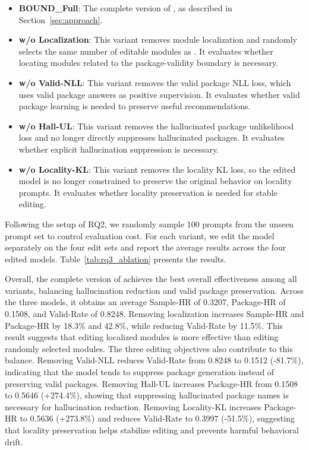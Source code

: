 \begin{itemize}[leftmargin=*]
    \item \textbf{BOUND\_Full}: The complete version of \appname, as described in Section~\ref{sec:approach}.
    \item \textbf{w/o Localization}: This variant removes module localization and randomly selects the same number of editable modules as \appname. It evaluates whether locating modules related to the package-validity boundary is necessary.
    \item \textbf{w/o Valid-NLL}: This variant removes the valid package NLL loss, which uses valid package answers as positive supervision. It evaluates whether valid package learning is needed to preserve useful recommendations.
    \item \textbf{w/o Hall-UL}: This variant removes the hallucinated package unlikelihood loss and no longer directly suppresses hallucinated packages. It evaluates whether explicit hallucination suppression is necessary.
    \item \textbf{w/o Locality-KL}: This variant removes the locality KL loss, so the edited model is no longer constrained to preserve the original behavior on locality prompts. It evaluates whether locality preservation is needed for stable editing.
\end{itemize}

Following the setup of RQ2, we randomly sample 100 prompts from the unseen prompt set to control evaluation cost. For each variant, we edit the model separately on the four edit sets and report the average results across the four edited models. Table~\ref{tab:rq3_ablation} presents the results.

Overall, the complete version of \appname achieves the best overall effectiveness among all variants, balancing hallucination reduction and valid package preservation.
Across the three models, it obtains an average Sample-HR of 0.3207, Package-HR of 0.1508, and Valid-Rate of 0.8248.
Removing localization increases Sample-HR and Package-HR by 18.3\% and 42.8\%, while reducing Valid-Rate by 11.5\%. 
This result suggests that editing localized modules is more effective than editing randomly selected modules.
The three editing objectives also contribute to this balance. 
Removing Valid-NLL reduces Valid-Rate from 0.8248 to 0.1512 (-81.7\%), indicating that the model tends to suppress package generation instead of preserving valid packages. 
Removing Hall-UL increases Package-HR from 0.1508 to 0.5646 (+274.4\%), showing that suppressing hallucinated package names is necessary for hallucination reduction. 
Removing Locality-KL increases Package-HR to 0.5636 (+273.8\%) and reduces Valid-Rate to 0.3997 (-51.5\%), suggesting that locality preservation helps stabilize editing and prevents harmful behavioral drift.

